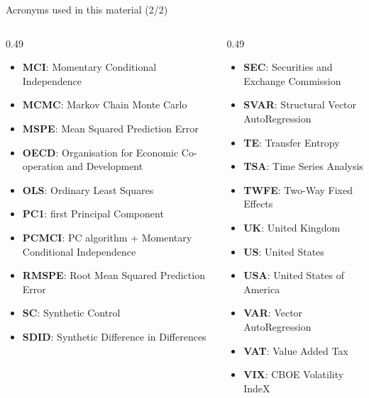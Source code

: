 \begin{frame}{Acronyms used in this material (2/2)}
\begin{columns}[T]
\begin{column}{0.49\textwidth}
\begin{itemize}\setlength{\itemsep}{0pt}
    \item \textbf{MCI}: Momentary Conditional Independence
    \item \textbf{MCMC}: Markov Chain Monte Carlo
    \item \textbf{MSPE}: Mean Squared Prediction Error
    \item \textbf{OECD}: Organisation for Economic Co-operation and Development
    \item \textbf{OLS}: Ordinary Least Squares
    \item \textbf{PC1}: first Principal Component
    \item \textbf{PCMCI}: PC algorithm + Momentary Conditional Independence
    \item \textbf{RMSPE}: Root Mean Squared Prediction Error
    \item \textbf{SC}: Synthetic Control
    \item \textbf{SDID}: Synthetic Difference in Differences
\end{itemize}
\end{column}
\begin{column}{0.49\textwidth}
\begin{itemize}\setlength{\itemsep}{0pt}
    \item \textbf{SEC}: Securities and Exchange Commission
    \item \textbf{SVAR}: Structural Vector AutoRegression
    \item \textbf{TE}: Transfer Entropy
    \item \textbf{TSA}: Time Series Analysis
    \item \textbf{TWFE}: Two-Way Fixed Effects
    \item \textbf{UK}: United Kingdom
    \item \textbf{US}: United States
    \item \textbf{USA}: United States of America
    \item \textbf{VAR}: Vector AutoRegression
    \item \textbf{VAT}: Value Added Tax
    \item \textbf{VIX}: CBOE Volatility IndeX
\end{itemize}
\end{column}
\end{columns}
\end{frame}

